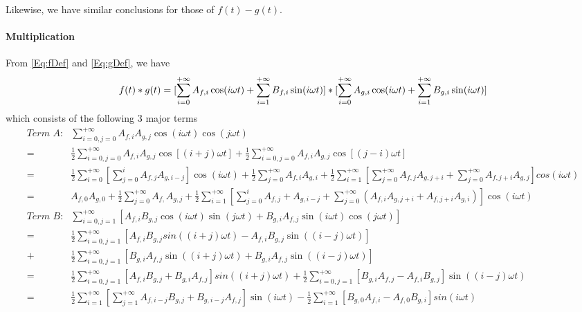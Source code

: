 \documentclass[12pt]{article}
\begin{document}
Likewise, we have similar conclusions for those of $f(t)-g(t)$.
\paragraph{Multiplication}\label{App-Para:Multiplication}
From \autoref{Eq:fDef} and \autoref{Eq:gDef}, we have
\begin{equation}
	f(t)*g(t)=[\sum_{i=0}^{+\infty}A_{f, i}\cos(i\omega t)+\sum_{i=1}^{+\infty}B_{f, i}\sin(i\omega t)]*[\sum_{i=0}^{+\infty}A_{g, i}\cos(i\omega t)+\sum_{i=1}^{+\infty}B_{g, i}\sin(i\omega t)]\\
\end{equation}
which consists of the following 3 major terms
\begin{equation}
	\begin{aligned}
	\textit{Term A:} &\sum_{i=0, j=0}^{+\infty}A_{f,i}A_{g,j}\cos(i\omega t)\cos(j\omega t)\\
	=&\frac{1}{2}\sum_{i=0, j=0}^{+\infty}A_{f, i}A_{g, j}\cos[(i+j)\omega t] + \frac{1}{2}\sum_{i=0, j=0}^{+\infty}A_{f, i}A_{g, j}\cos[(j-i)\omega t]\\
	=&\frac{1}{2}\sum_{i=0}^{+\infty}[\sum_{j=0}^{i}A_{f,j}A_{g,i-j}]\cos(i\omega t)+\frac{1}{2}\sum_{j=0}^{+\infty}A_{f,i}A_{g,i}+\frac{1}{2}\sum_{i=1}^{+\infty}[\sum_{j=0}^{+\infty}A_{f, j}A_{g, j+i}+\sum_{j=0}^{+\infty}A_{f, j+i}A_{g, j}]cos(i\omega t)\\
	=&A_{f,0}A_{g,0}+\frac{1}{2}\sum_{j=0}^{+\infty}A_{f,}A_{g,j}+\frac{1}{2}\sum_{i=1}^{+\infty}[\sum_{j=0}^{i}A_{f,j}+A_{g,i-j}+\sum_{j=0}^{+\infty}(A_{f,i}A_{g,j+i}+A_{f,j+i}A_{g,i})]\cos(i\omega t)\\
	\textit{Term B:} &\sum_{i=0,j=1}^{+\infty}[A_{f,i}B_{g,j}\cos(i\omega t)\sin(j\omega t)+B_{g,i}A_{f,j}\sin(i\omega t)\cos(j\omega t)]\\
	=&\frac{1}{2}\sum_{i=0,j=1}^{+\infty}[A_{f,i}B_{g,j}sin((i+j)\omega t)-A_{f,i}B_{g,j}\sin((i-j)\omega t)]\\+&\frac{1}{2}\sum_{i=0,j=1}^{+\infty}[B_{g,i}A_{f,j}\sin((i+j)\omega t)+B_{g,i}A_{f,j}\sin((i-j)\omega t)]\\
	=&\frac{1}{2}\sum_{i=0,j=1}^{+\infty}[A_{f,i}B_{g,j}+B_{g,i}A_{f,j}]sin((i+j)\omega t)+\frac{1}{2}\sum_{i=0,j=1}^{+\infty}[B_{g,i}A_{f,j}-A_{f,i}B_{g,j}]\sin((i-j)\omega t)\\
	=&\frac{1}{2}\sum_{i=1}^{+\infty}[\sum_{j=1}^{+\infty}A_{f,i-j}B_{g,j}+B_{g,i-j}A_{f,j}]\sin(i\omega t)-\frac{1}{2}\sum_{i=1}^{+\infty}[B_{g,0}A_{f,i}-A_{f,0}B_{g,i}]sin(i\omega t)\\

\end{aligned}
\end{equation}
\end{document}
